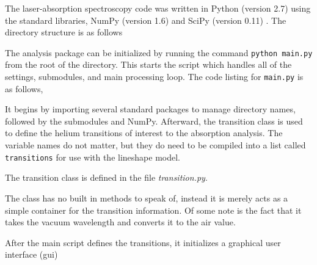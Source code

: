The laser-absorption spectroscopy code was written in Python (version 2.7) using
the standard libraries, NumPy (version 1.6) and SciPy (version 0.11)
\cite{Jones2001}. The directory structure is as follows


The analysis package can be initialized by running the command
\texttt{python main.py} from the root of the directory. This starts the
script which handles all of the settings, submodules, and main
processing loop. The code listing for \texttt{main.py} is as follows,

{\singlespacing

}

It begins by importing several standard packages to manage directory names,
followed by the submodules and NumPy. Afterward, the transition class is used to
define the helium transitions of interest to the absorption analysis. The
variable names do not matter, but they do need to be compiled into a list called
\texttt{transitions} for use with the lineshape model.

The transition class is defined in the file \emph{transition.py}.

{\singlespacing

}

The class has no built in methods to speak of, instead it is merely acts as a
simple container for the transition information. Of some note is the fact that
it takes the vacuum wavelength and converts it to the air value.

After the main script defines the transitions, it initializes a graphical user
interface (\acs{gui}) 
